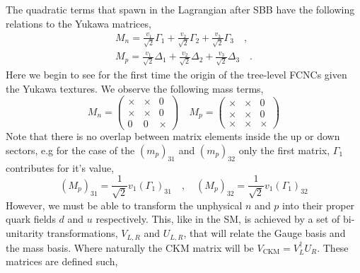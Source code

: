 %
%
%
The quadratic terms that spawn in the Lagrangian after SBB have the following relations to the Yukawa matrices,
% 
\begin{equation}
\label{eq:3HDM_Quark_gauge_mass}
\begin{split}
M_n = \frac{v_1}{\sqrt{2}} \Gamma_1 +  \frac{v_2}{\sqrt{2}} \Gamma_2 +  \frac{v_3}{\sqrt{2}} \Gamma_3  \quad , \\ 
M_p = \frac{v_1}{\sqrt{2}} \Delta_1 +  \frac{v_2}{\sqrt{2}} \Delta_2 +  \frac{v_3}{\sqrt{2}} \Delta_3   \quad .
\end{split}
\end{equation}
%
Here we begin to see for the first time the origin of the tree-level FCNCs given the Yukawa textures. We observe the following mass terms,
%
\begin{equation}
M_n = \begin{pmatrix}
\times & \times & 0 \\
\times & \times & 0 \\
0 & 0 & \times 
\end{pmatrix} 
\quad 
M_p=\begin{pmatrix}
\times & \times & 0 \\
\times & \times & 0 \\
\times & \times & \times 
\end{pmatrix}
\end{equation}
% 
Note that there is no overlap between matrix elements inside the up or down sectors, e.g for the case of the $(m_p)_{31}$ and $(m_p)_{32}$ only the first matrix, $\Gamma_1$ contributes for it's value, 
\begin{equation}
(M_p)_{31} = \frac{1}{\sqrt{2}} v_1 (\Gamma_1)_{31} \quad , \quad (M_p)_{32} = \frac{1}{\sqrt{2}} v_1 (\Gamma_1)_{32} 
\end{equation}
%
However, we must be able to transform the unphysical $n$ and $p$ into their proper quark fields $d$ and $u$ respectively. 
%
This, like in the SM, is achieved by a set of bi-unitarity transformations, $V_{L,R}$ and $U_{L,R}$, that will relate the Gauge basis and the mass basis. Where naturally the CKM matrix will be $V_{\text{CKM}} = V_L^\dagger U_R$. These matrices are defined such, 
